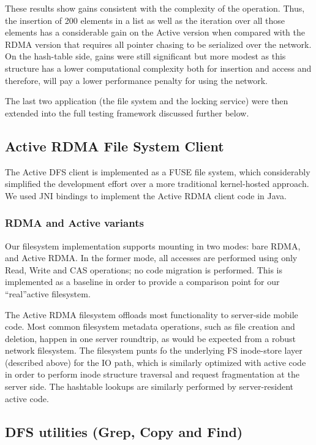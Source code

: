 \documentclass[10pt]{article}
\begin{document}
These results show gains consistent with the complexity of the
operation. Thus, the insertion of 200 elements in a list as well as
the iteration over all those elements has a considerable gain on the
Active version when compared with the RDMA version that requires all
pointer chasing to be serialized over the network. On the hash-table
side, gains were still significant but more modest as this structure
has a lower computational complexity both for insertion and access and
therefore, will pay a lower performance penalty for using the network.

The last two application (the file system and the locking service)
were then extended into the full testing framework discussed further
below.

\subsection{Active RDMA File System Client}

The Active DFS client is implemented as a FUSE file system, which
considerably simplified the development effort over a more traditional
kernel-hosted approach. We used JNI bindings to implement the Active
RDMA client code in Java.

\subsubsection{RDMA and Active variants}

Our filesystem implementation supports mounting in two modes: bare
RDMA, and Active RDMA. In the former mode, all accesses are performed
using only Read, Write and CAS operations; no code migration is
performed. This is implemented as a baseline in order to provide a
comparison point for our ``real''active filesystem.

The Active RDMA filesystem offloads most functionality to server-side
mobile code. Most common filesystem metadata operations, such as file
creation and deletion, happen in one server roundtrip, as would be
expected from a robust network filesystem. The filesystem punts fo the
underlying FS inode-store layer (described above) for the IO path,
which is similarly optimized with active code in order to perform
inode structure traversal and request fragmentation at the server
side. The hashtable lookups are similarly performed by server-resident
active code.

\subsection{DFS utilities (Grep, Copy and Find)}
\end{document}
